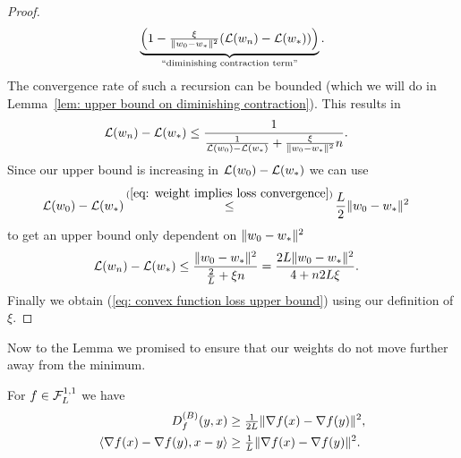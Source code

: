 \begin{proof}
\begin{align*}
		\underbrace{
			\left(1 - \tfrac{\xi}{\|w_0-w_*\|^2}(\mathcal{L}(w_n)-\mathcal{L}(w_*))\right)
		}_{\text{``diminishing contraction term''}}.
	\end{align*}
	The convergence rate of such a recursion can be bounded (which we will do in
	Lemma~\ref{lem: upper bound on diminishing contraction}). This results in 
	\begin{align*}
		\mathcal{L}(w_n)-\mathcal{L}(w_*)
		&\le \frac{1}{
			\frac{1}{\mathcal{L}(w_0)-\mathcal{L}(w_*)} + \tfrac{\xi}{\|w_0-w_*\|^2}n
		}.
	\end{align*}
	Since our upper bound is increasing in \(\mathcal{L}(w_0)-\mathcal{L}(w_*)\)
	we can use
	\begin{align*}
		\Loss(\weights_0) - \Loss(\minimum)
		&\xle{(\ref{eq: weight implies loss convergence})}
		\frac{\ubound}{2}\|\weights_0-\minimum\|^2
	\end{align*}
	to get an upper bound only dependent on \(\|w_0 - w_*\|^2\)
	\begin{align*}
		\mathcal{L}(w_n)-\mathcal{L}(w_*)
		&\le \frac{\|w_0-w_*\|^2}{
			\frac{2}{L} + \xi n
		}
		= \frac{2L\|w_0-w_*\|^2}{
			4 + n 2L \xi
		}.
	\end{align*}
	Finally we obtain (\ref{eq: convex function loss upper bound}) using our
	definition of \(\xi\).
\end{proof}
%
Now to the Lemma we promised to ensure that our weights do not move further away
from the minimum.
%
\begin{lemma}\label{lem: bermanDiv lower bound}
	For \(f\in\mathcal{F}^{1,1}_{L}\) we have
	\begin{subequations}
	\begin{align}
		D^{(B)}_{f}(y,x)
		&\ge \tfrac{1}{2L}\|\nabla f(x) - \nabla f(y)\|^2,\\
		\label{eq: bregmanDiv lower bound b}
		\langle \nabla f(x) - \nabla f(y), x-y\rangle
		&\ge \tfrac{1}{L}\|\nabla f(x) - \nabla f(y)\|^2.
	\end{align}	
	\end{subequations}	
\end{lemma}
